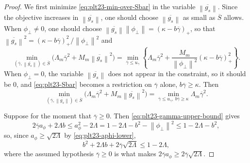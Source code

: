 \documentclass[11pt]{article}
\numberwithin{equation}{section}
\newcommand{\norm}[1]{\left\lVert #1\right\rVert}
\newcommand{\pos}[1]{\left(#1\right)_{+}}
\begin{document}
\begin{proof}
  We first minimize \eqref{eq:plt23-min-over-Sbar} in the variable
  $\overline{\norm{g_s}}$.  Since the objective increases in $\overline{\norm{g_s}}$, one should choose $\overline{\norm{g_s}}$ as small as $\overline S$ allows.  When $\phi_\perp\ne0$, one should choose
  $\overline{\norm{g_s}}\norm{\phi_\perp}=\pos{\kappa-b\overline\gamma}$, so that
  $\overline{\norm{g_s}}^2=\pos{\kappa-b\overline\gamma}^2/\norm{\phi_\perp}^2$
  and
  \begin{equation}\label{eq:plt23-one-d-t}
    \min_{(\overline\gamma,\overline{\norm{g_s}})\in\overline S}
    \bigl(\Lambda_m\overline\gamma^2+M_m\overline{\norm{g_s}}^2\bigr)
    =\min_{\overline\gamma\le u_\gamma}
    \left\{
    \Lambda_m\overline\gamma^2
    +\frac{M_m}{\norm{\phi_\perp}^2}\pos{\kappa-b\overline\gamma}^2
    \right\}.
  \end{equation}
  When $\phi_\perp=0$, the variable $\overline{\norm{g_s}}$ does not appear in
  the constraint, so it should be $0$, and \eqref{eq:plt23-Sbar} becomes a
  restriction on $\overline\gamma$ alone, $b\overline\gamma\ge\kappa$.  Then
  \begin{equation}\label{eq:plt23-one-d-t-zero}
    \min_{(\overline\gamma,\overline{\norm{g_s}})\in\overline S}
    \bigl(\Lambda_m\overline\gamma^2+M_m\overline{\norm{g_s}}^2\bigr)
    =\min_{\overline\gamma\le u_\gamma,\ b\overline\gamma\ge\kappa}
    \Lambda_m\overline\gamma^2.
  \end{equation}

  Suppose for the moment that $\overline\gamma\ge0$.  Then
  \eqref{eq:plt23-gamma-upper-bound} gives
  \[
    2\overline\gamma a_\phi+2\Lambda b
    \le a_\phi^2-2\Lambda=1-2\Lambda-b^2-\norm{\phi_\perp}^2
    \le1-2\Lambda-b^2,
  \]
  so, since $a_\phi\ge\sqrt{2\Lambda}$ by \eqref{eq:plt23-aphi-lower},
  \begin{equation}\label{eq:plt23-b-gamma-budget}
    b^2+2\Lambda b+2\overline\gamma\sqrt{2\Lambda}\le1-2\Lambda,
  \end{equation}
  where the assumed hypothesis $\overline\gamma\ge0$ is what makes
  $2\overline\gamma a_\phi\ge2\overline\gamma\sqrt{2\Lambda}$.


\end{proof}
\end{document}
